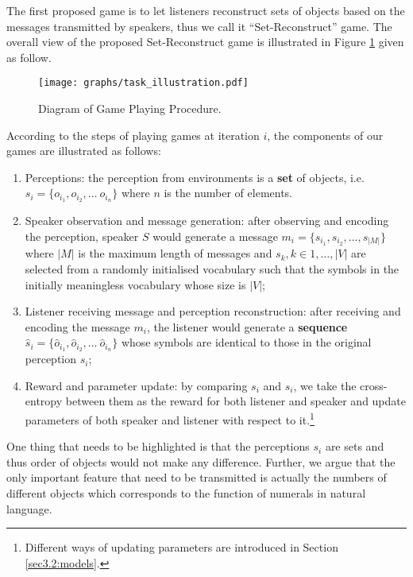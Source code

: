 The first proposed game is to let listeners reconstruct sets of objects based on the messages transmitted by speakers, thus we call it ``Set-Reconstruct'' game. The overall view of the proposed Set-Reconstruct game is illustrated in Figure \ref{fig2:game_procedure} given as follow.

\begin{figure}[!h]
  \centering
  \texttt{[image: graphs/task\_illustration.pdf]}
  \caption{Diagram of Game Playing Procedure.}
  \label{fig2:game_procedure}
\end{figure}

According to the steps of playing games at iteration $i$, the components of our games are illustrated as follows:
\begin{enumerate}
  \item Perceptions: the perception from environments is a \textbf{set} of objects, i.e. $s_i=\{o_{i_1}, o_{i_2}, \dots\ o_{i_n}\}$ where $n$ is the number of elements.
  \item Speaker observation and message generation: after observing and encoding the perception, speaker $S$ would generate a message $m_i=\{s_{i_1}, s_{i_2}, \dots, s_{|M|}\}$ where $|M|$ is the maximum length of messages and $s_k, k \in {1, \dots, |V|}$ are selected from a randomly initialised vocabulary such that the symbols in the initially meaningless vocabulary whose size is $|V|$;
  \item Listener receiving message and perception reconstruction: after receiving and encoding the message $m_i$, the listener would generate a \textbf{sequence} $\hat{s}_i = \{\hat{o}_{i_1}, \hat{o}_{i_2}, \dots\ \hat{o}_{i_n}\}$ whose symbols are identical to those in the original perception $s_i$;
  \item Reward and parameter update: by comparing $s_i$ and $\hat{s}_i$, we take the cross-entropy between them as the reward for both listener and speaker and update parameters of both speaker and listener with respect to it.\footnote{Different ways of updating parameters are introduced in Section \ref{sec3.2:models}.}
\end{enumerate}

One thing that needs to be highlighted is that the perceptions $s_i$ are sets and thus order of objects would not make any difference. Further, we argue that the only important feature that need to be transmitted is actually the numbers of different objects which corresponds to the function of numerals in natural language.

